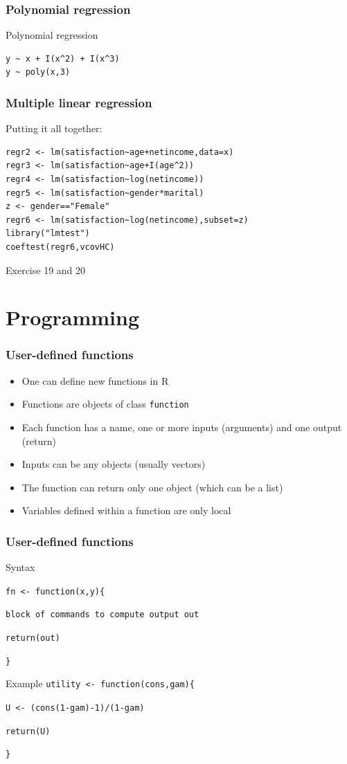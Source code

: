 \documentclass[xcolor={svgnames},10pt,
handout
]{beamer}
\begin{document}
\begin{frame}[fragile]\frametitle{Polynomial regression}
Polynomial regression
\begin{lstlisting}
y ~ x + I(x^2) + I(x^3)
y ~ poly(x,3)
\end{lstlisting}
\end{frame}

\begin{frame}[fragile]
\frametitle{Multiple linear regression}
Putting it all together:
\begin{lstlisting}
regr2 <- lm(satisfaction~age+netincome,data=x)
regr3 <- lm(satisfaction~age+I(age^2))
regr4 <- lm(satisfaction~log(netincome))
regr5 <- lm(satisfaction~gender*marital)
z <- gender=="Female"
regr6 <- lm(satisfaction~log(netincome),subset=z)
library("lmtest")
coeftest(regr6,vcovHC)
\end{lstlisting}
\end{frame}



\begin{frame}[standout]
Exercise 19 and 20
\end{frame}

\section{Programming} 
\begin{frame}
\frametitle{User-defined functions}
\begin{itemize}
\item One can define new functions in R
\item Functions are objects of class \texttt{function}
\item Each function has a name, one or more inputs (arguments) \newline
and one output (return)
\item Inputs can be any objects (usually vectors)
\item The function can return only one object (which can be a list)
\item Variables defined within a function are only local
\end{itemize}
\end{frame}


\begin{frame}
\frametitle{User-defined functions}
Syntax\medskip

\texttt{fn <- function(x,y)\{}

\quad \texttt{block of commands to compute output out}

\quad \texttt{return(out)}

\quad \texttt{\}\bigskip}
\begin{block}{Example}
\texttt{utility <- function(cons,gam)\{}

\quad \texttt{U <- (cons(1-gam)-1)/(1-gam)}

\quad \texttt{return(U)}

\quad \texttt{\}}
\end{block}
\end{frame}
\end{document}
